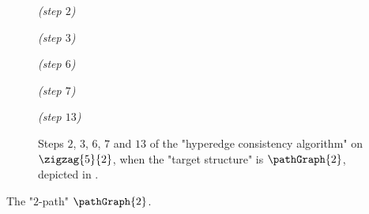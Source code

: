 \begin{figure}
	\centering
	\begin{tikzpicture}
		
		
	\end{tikzpicture}
	\quad\emph{(step $2$)~}\\[2em]
	\begin{tikzpicture}
		
		
	\end{tikzpicture}
	\quad\emph{(step $3$)~}\\[2em]
	\begin{tikzpicture}
		
		
	\end{tikzpicture}
	\quad\emph{(step $6$)~}\\[2em]
	\begin{tikzpicture}
		
		
	\end{tikzpicture}
	\quad\emph{(step $7$)~}\\[2em]
	\begin{tikzpicture}
		
		
	\end{tikzpicture}
	\quad\emph{(step $13$)}
	\caption{%
		\AP\label{fig:zigzag-graph-HC-P2}
		Steps $2$, $3$, $6$, $7$ and $13$ of the "hyperedge consistency algorithm"
		on $\zigzag{5}{2}$,
		when the "target structure" is $\pathGraph{2}$, depicted in .%
	}
\end{figure}
\begin{marginfigure}[-12em]
	\centering
	\begin{tikzpicture}
		
	\end{tikzpicture}
	\caption{
		\AP\label{fig:zigzag-graph-HC-P2-side-P2}
		The "$2$-path" $\pathGraph{2}$.
	}
\end{marginfigure}
